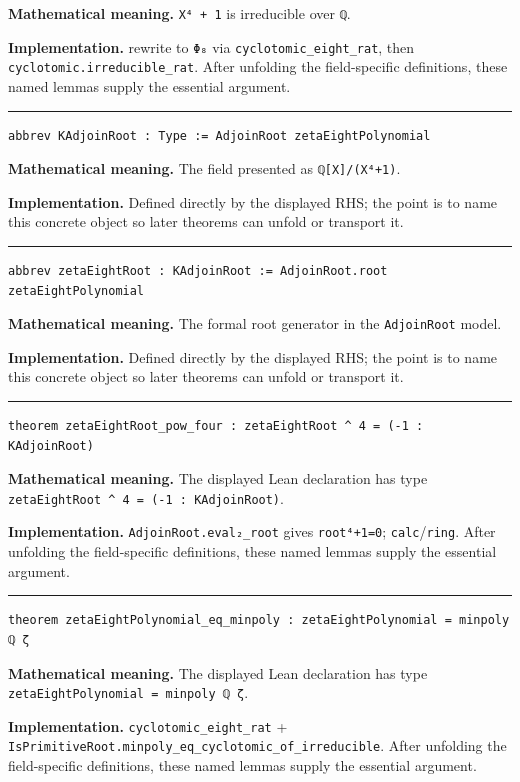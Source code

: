 \documentclass[UTF8,a4paper,11pt,fontset=fandol]{ctexart}
\theoremstyle{definition}
\newcommand{\statementsep}{\par\medskip\hrule\medskip}
\begin{document}
\noindent\textbf{Mathematical meaning.} \texttt{X⁴ + 1} is irreducible over \texttt{ℚ}.\par
\noindent\textbf{Implementation.} rewrite to \texttt{Φ₈} via \texttt{cyclotomic\_\allowbreak{}eight\_\allowbreak{}rat}, then \texttt{cyclotomic.\allowbreak{}irreducible\_\allowbreak{}rat}. After unfolding the field-specific definitions, these named lemmas supply the essential argument.\par
\statementsep
\begin{verbatim}
abbrev KAdjoinRoot : Type := AdjoinRoot zetaEightPolynomial
\end{verbatim}
\noindent\textbf{Mathematical meaning.} The field presented as \texttt{ℚ[X]/\allowbreak{}(X⁴+1)}.\par
\noindent\textbf{Implementation.} Defined directly by the displayed RHS; the point is to name this concrete object so later theorems can unfold or transport it.\par
\statementsep
\begin{verbatim}
abbrev zetaEightRoot : KAdjoinRoot := AdjoinRoot.root zetaEightPolynomial
\end{verbatim}
\noindent\textbf{Mathematical meaning.} The formal root generator in the \texttt{AdjoinRoot} model.\par
\noindent\textbf{Implementation.} Defined directly by the displayed RHS; the point is to name this concrete object so later theorems can unfold or transport it.\par
\statementsep
\begin{verbatim}
theorem zetaEightRoot_pow_four : zetaEightRoot ^ 4 = (-1 : KAdjoinRoot)
\end{verbatim}
\noindent\textbf{Mathematical meaning.} The displayed Lean declaration has type \texttt{zetaEightRoot \textasciicircum{} 4 = (-1 : KAdjoinRoot)}.\par
\noindent\textbf{Implementation.} \texttt{AdjoinRoot.\allowbreak{}eval₂\_\allowbreak{}root} gives \texttt{root⁴+1=0}; \texttt{calc}/\texttt{ring}. After unfolding the field-specific definitions, these named lemmas supply the essential argument.\par
\statementsep
\begin{verbatim}
theorem zetaEightPolynomial_eq_minpoly : zetaEightPolynomial = minpoly ℚ ζ
\end{verbatim}
\noindent\textbf{Mathematical meaning.} The displayed Lean declaration has type \texttt{zetaEightPolynomial = minpoly ℚ ζ}.\par
\noindent\textbf{Implementation.} \texttt{cyclotomic\_\allowbreak{}eight\_\allowbreak{}rat} + \texttt{IsPrimitiveRoot.\allowbreak{}minpoly\_\allowbreak{}eq\_\allowbreak{}cyclotomic\_\allowbreak{}of\_\allowbreak{}irreducible}. After unfolding the field-specific definitions, these named lemmas supply the essential argument.\par
\end{document}
